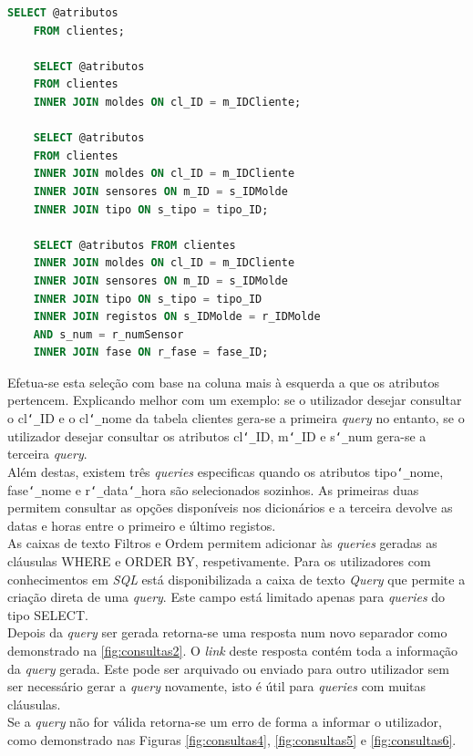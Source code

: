 \documentclass[11pt,twoside,a4paper]{report}
\begin{document}
\begin{lstlisting}[language = SQL]
	SELECT @atributos
	FROM clientes;
	
	SELECT @atributos
	FROM clientes
	INNER JOIN moldes ON cl_ID = m_IDCliente;
	
	SELECT @atributos
	FROM clientes
	INNER JOIN moldes ON cl_ID = m_IDCliente
	INNER JOIN sensores ON m_ID = s_IDMolde
	INNER JOIN tipo ON s_tipo = tipo_ID;
	
	SELECT @atributos FROM clientes
	INNER JOIN moldes ON cl_ID = m_IDCliente
	INNER JOIN sensores ON m_ID = s_IDMolde 
	INNER JOIN tipo ON s_tipo = tipo_ID
	INNER JOIN registos ON s_IDMolde = r_IDMolde
	AND s_num = r_numSensor
	INNER JOIN fase ON r_fase = fase_ID;
\end{lstlisting}
Efetua-se esta seleção com base na coluna mais à esquerda a que os atributos pertencem. Explicando melhor com um exemplo: se o utilizador desejar consultar o cl\texttt{\char`_}ID e o cl\texttt{\char`_}nome da tabela clientes gera-se a primeira \textit{query} no entanto, se o utilizador desejar consultar os atributos cl\texttt{\char`_}ID, m\texttt{\char`_}ID e s\texttt{\char`_}num gera-se a terceira \textit{query}.\\
Além destas, existem três \textit{queries} especificas quando os atributos tipo\texttt{\char`_}nome, fase\texttt{\char`_}nome e r\texttt{\char`_}data\texttt{\char`_}hora são selecionados sozinhos. As primeiras duas permitem consultar as opções disponíveis nos dicionários e a terceira devolve as datas e horas entre o primeiro e último registos.\\
As caixas de texto Filtros e Ordem permitem adicionar às \textit{queries} geradas as cláusulas WHERE e ORDER BY, respetivamente. Para os utilizadores com conhecimentos em \textit{SQL} está disponibilizada a caixa de texto \textit{Query} que permite a criação direta de uma \textit{query}. Este campo está limitado apenas para \textit{queries} do tipo SELECT.\\
Depois da \textit{query} ser gerada retorna-se uma resposta num novo separador como demonstrado na \autoref{fig:consultas2}. O \textit{link} deste resposta contém toda a informação da \textit{query} gerada. Este pode ser arquivado ou enviado para outro utilizador sem ser necessário gerar a \textit{query} novamente, isto é útil para \textit{queries} com muitas cláusulas.\\
Se a \textit{query} não for válida retorna-se um erro de forma a informar o utilizador, como demonstrado nas Figuras \ref{fig:consultas4}, \ref{fig:consultas5} e \ref{fig:consultas6}.
\end{document}
